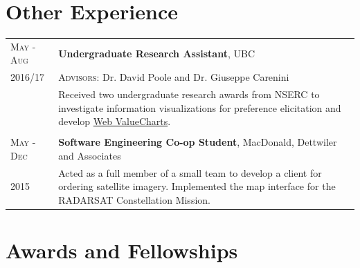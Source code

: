 \documentclass[10pt]{article}
\newcommand{\spacing}{\vspace{0.5cm}}
\begin{document}
\section{Other Experience}
\begin{longtable}{R{1.8cm}|L{11.8cm}}
    \textsc{May - Aug} & \textbf{Undergraduate Research Assistant}, UBC
    \\ 2016/17 & \textsc{Advisors:} Dr.  David Poole and Dr.
    Giuseppe Carenini                                                                      \\
                       & {\small Received two undergraduate research awards
                             from NSERC to investigate information visualizations for
                             preference elicitation and
                             develop \href{http://www.cs.ubc.ca/group/iui/VALUECHARTS/}{Web
                                 ValueCharts}.  }
    \\
                                                                       \\
    \textsc{May - Dec} & \textbf{Software Engineering Co-op Student},
    MacDonald, Dettwiler and Associates                                                    \\
    2015
                       & {\small Acted as a full member of a small team to
                             develop a client for ordering satellite imagery.
                             Implemented the map interface for the RADARSAT
                             Constellation Mission.  }
\end{longtable}

\spacing

\section{Awards and Fellowships}
\end{document}

